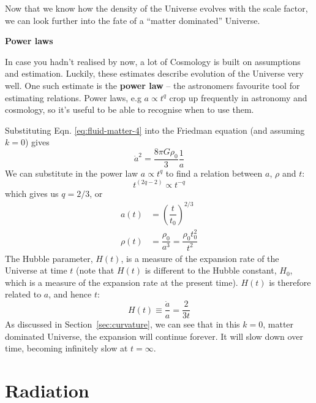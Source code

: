\documentclass[11pt,a4paper]{book}
\begin{document}
Now that we know how the density of the Universe evolves with the scale
factor, we can look further into the fate of a ``matter dominated''
Universe.

\textbf{Power laws}

In case you hadn't realised by now, a lot of Cosmology is built on
assumptions and estimation. Luckily, these estimates describe evolution
of the Universe very well. One such estimate is the \textbf{power law} -- the
astronomers favourite tool for estimating relations. Power laws, e.g
\(a \propto t^q\) crop up frequently in astronomy and cosmology, so it's
useful to be able to recognise when to use them.

Substituting Eqn. \eqref{eq:fluid-matter-4} into the Friedman equation (and assuming \(k=0\))
gives
\begin{equation}
\dot{a}^2 = \dfrac{8\pi G \rho_0}{3}\dfrac{1}{a}
\label{eq:power-1}
\end{equation}
We can substitute in the power law \(a \propto t^q\) to find a relation between
\(a\), \(\rho\) and \(t\):
\begin{equation}
t^{(2q-2)} \propto t^{-q}
\label{eq:power-2}
\end{equation}
which gives us
\(q = 2/3\), or
\begin{align}
    a(t) &= \left(\dfrac{t}{t_0}\right)^{2/3}\\
    \rho(t) &= \dfrac{\rho_0}{a^3} = \dfrac{\rho_0 t_{0}^{2}}{t^2}
    \label{eq:power-3}
\end{align}
The Hubble parameter, \(H(t)\), is a measure of the expansion rate of the
Universe at time \(t\) (note that \(H(t)\) is different to the Hubble constant, \(H_0\), which is a measure of
the expansion rate at the present time). \(H(t)\) is therefore related to \(a\), and hence
\(t\):
\begin{equation}
H(t) \equiv \dfrac{\dot{a}}{a} = \dfrac{2}{3t}
\label{eq:power-4}
\end{equation}
As discussed in Section~\ref{sec:curvature}, we can see that in this \(k=0\), matter
dominated Universe, the expansion will continue forever. It will slow
down over time, becoming infinitely slow at \(t=\infty\).

\hypertarget{sec:radiation-eos}{%
\section{Radiation}\label{sec:radiation-eos}}
\end{document}
